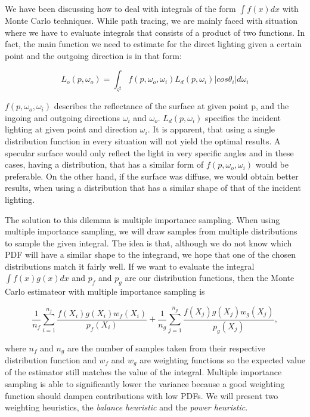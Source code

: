 We have been discussing how to deal with integrals of the form $\int{f(x)dx}$ with Monte Carlo techniques. While path tracing, we are mainly faced with situation where we have to evaluate integrals that consists of a product of two functions. In fact, the main function we need to estimate for the direct lighting given a certain point and the outgoing direction is in that form:

\begin{equation}
L_o(p, \omega_o) = \int_{\varsigma^2}f(p, \omega_o, \omega_i)L_d(p, \omega_i)|cos\theta_i|d\omega_i
\end{equation}

$f(p, \omega_o, \omega_i)$ describes the reflectance of the surface at given point p, and the ingoing and outgoing directions $\omega_i$ and $\omega_o$. $L_d(p, \omega_i)$ specifies the incident lighting at given point and direction $\omega_i$. It is apparent, that using a single distribution function in every situation will not yield the optimal results. A specular surface would only reflect the light in very specific angles and in these cases, having a distribution, that has a similar form of $f(p, \omega_o, \omega_i)$ would be preferable. On the other hand, if the surface was diffuse, we would obtain better results, when using a distribution that has a similar shape of that of the incident lighting.

The solution to this dilemma is multiple importance sampling. When using multiple importance sampling, we will draw samples from multiple distributions to sample the given integral. The idea is that, although we do not know which PDF will have a similar shape to the integrand, we hope that one of the chosen distributions match it fairly well. If we want to evaluate the integral $\int{f(x)g(x)dx}$ and $p_f$ and $p_g$ are our distribution functions, then the Monte Carlo estimateor with multiple importance sampling is

\begin{equation}
\frac{1}{n_f}\sum_{i = 1}^{n_f}{\frac{f(X_i)g(X_i)w_f(X_i)}{p_f(X_i)}}+ \frac{1}{n_g}\sum_{j = 1}^{n_g}{\frac{f(X_j)g(X_j)w_g(X_j)}{p_g(X_j)}},
\end{equation}

where $n_f$ and $n_g$ are the number of samples taken from their respective distribution function and $w_f$ and $w_g$ are weighting functions so the expected value of the estimator still matches the value of the integral. Multiple importance sampling is able to significantly lower the variance because a good weighting function should dampen contributions with low PDFs. We will present two weighting heuristics, the \textit{balance heuristic} and the \textit{power heuristic}.

